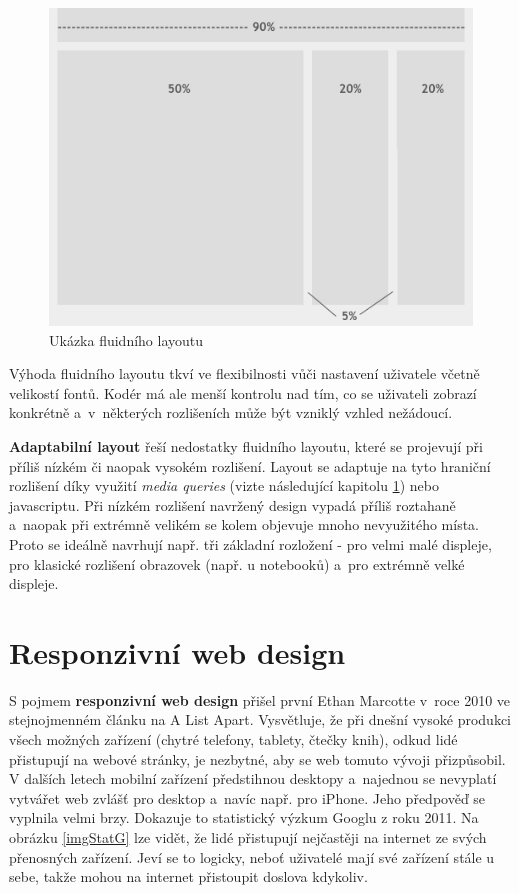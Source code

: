 \documentclass[thesis=B,czech]{FITthesis}[2012/06/26]
\begin{document}
\begin{figure}[h]
	\begin{center}
	\includegraphics[scale=0.5]{images/image21.jpg}
	\end{center}
	\caption{Ukázka fluidního layoutu \cite{fix}}
	\label{imgFluid}
\end{figure}

Výhoda fluidního layoutu tkví ve flexibilnosti vůči nastavení uživatele včetně velikostí fontů. Kodér má ale menší kontrolu nad tím, co se uživateli zobrazí konkrétně a~v~některých rozlišeních může být vzniklý vzhled nežádoucí.

\textbf{Adaptabilní layout} řeší nedostatky fluidního layoutu, které se projevují při příliš nízkém či naopak vysokém rozlišení. Layout se adaptuje na tyto hraniční rozlišení díky využití \textit{media queries} (vizte následující kapitolu \ref{sec:rd}) nebo javascriptu. Při nízkém rozlišení navržený design vypadá příliš roztahaně a~naopak při extrémně velikém se kolem objevuje mnoho nevyužitého místa. Proto se ideálně navrhují např. tři základní rozložení - pro velmi malé displeje, pro klasické rozlišení obrazovek (např. u notebooků) a~pro extrémně velké displeje\cite{adapt}.


\section{Responzivní web design} \label{sec:rd}


S pojmem \textbf{responzivní web design} přišel první Ethan Marcotte v~roce 2010 ve stejnojmenném článku na  A List Apart. Vysvětluje, že při dnešní vysoké produkci všech možných zařízení (chytré telefony, tablety, čtečky knih), odkud lidé přistupují na webové stránky, je nezbytné, aby se web tomuto vývoji  přizpůsobil. V dalších letech mobilní zařízení předstihnou desktopy a~najednou se nevyplatí vytvářet web zvlášť pro desktop a~navíc např. pro iPhone\cite{res}. Jeho předpověď se vyplnila velmi brzy. Dokazuje to statistický výzkum Googlu z roku 2011. Na obrázku \ref{imgStatG} lze vidět, že lidé přistupují nejčastěji na internet ze svých přenosných zařízení. Jeví se to logicky, neboť uživatelé mají své zařízení stále u sebe, takže mohou na internet přistoupit doslova kdykoliv.
\end{document}
